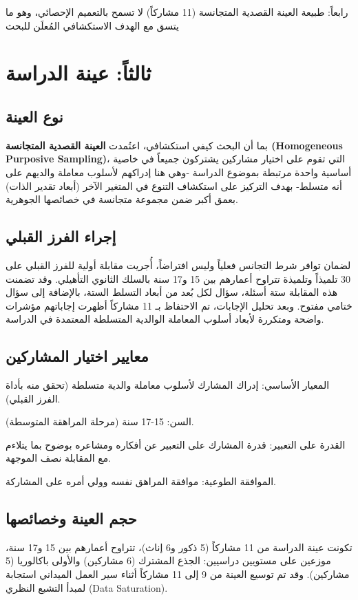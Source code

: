 \documentclass[12pt,oneside]{report}
\begin{document}
رابعاً: طبيعة العينة القصدية المتجانسة (11 مشاركاً) لا تسمح بالتعميم الإحصائي، وهو ما يتسق مع الهدف الاستكشافي المُعلَن للبحث

\section{ثالثاً: عينة الدراسة}
\subsection{نوع العينة}
بما أن البحث كيفي استكشافي، اعتُمدت \textbf{العينة القصدية المتجانسة (Homogeneous Purposive Sampling)}، التي تقوم على اختيار مشاركين يشتركون جميعاً في خاصية أساسية واحدة مرتبطة بموضوع الدراسة -وهي هنا إدراكهم لأسلوب معاملة والديهم على أنه متسلط- بهدف التركيز على استكشاف التنوع في المتغير الآخر (أبعاد تقدير الذات) بعمق أكبر ضمن مجموعة متجانسة في خصائصها الجوهرية.

\subsection{إجراء الفرز القبلي}
لضمان توافر شرط التجانس فعلياً وليس افتراضاً، أُجريت مقابلة أولية للفرز القبلي على 30 تلميذاً وتلميذة تتراوح أعمارهم بين 15 و17 سنة بالسلك الثانوي التأهيلي. وقد تضمنت هذه المقابلة ستة أسئلة، سؤال لكل بُعد من أبعاد التسلط الستة، بالإضافة إلى سؤال ختامي مفتوح. وبعد تحليل الإجابات، تم الاحتفاظ بـ 11 مشاركاً أظهرت إجاباتهم مؤشرات واضحة ومتكررة لأبعاد أسلوب المعاملة الوالدية المتسلطة المعتمدة في الدراسة.

\subsection{معايير اختيار المشاركين}
المعيار الأساسي: إدراك المشارك لأسلوب معاملة والدية متسلطة (تحقق منه بأداة الفرز القبلي).

السن: 15-17 سنة (مرحلة المراهقة المتوسطة).

القدرة على التعبير: قدرة المشارك على التعبير عن أفكاره ومشاعره بوضوح بما يتلاءم مع المقابلة نصف الموجهة.

الموافقة الطوعية: موافقة المراهق نفسه وولي أمره على المشاركة.

\subsection{حجم العينة وخصائصها}
تكونت عينة الدراسة من 11 مشاركاً (5 ذكور و6 إناث)، تتراوح أعمارهم بين 15 و17 سنة، موزعين على مستويين دراسيين: الجذع المشترك (6 مشاركين) والأولى باكالوريا (5 مشاركين). وقد تم توسيع العينة من 9 إلى 11 مشاركاً أثناء سير العمل الميداني استجابة لمبدأ التشبع النظري (Data Saturation).
\end{document}
